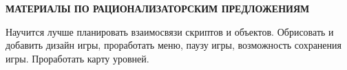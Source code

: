 \begin{center}
\bfseries{\large МАТЕРИАЛЫ ПО РАЦИОНАЛИЗАТОРСКИМ ПРЕДЛОЖЕНИЯМ}
\end{center}

Научится лучше планировать взаимосвязи скриптов и объектов. Обрисовать и добавить дизайн игры, проработать меню, паузу игры, возможность сохранения игры. Проработать карту уровней.

\pagebreak
